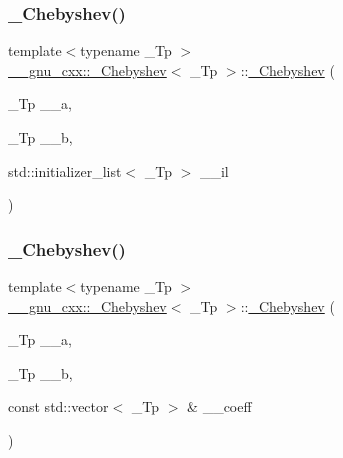 \mbox{\label{class____gnu__cxx_1_1__Chebyshev_a3bbf8155026331ee6a644253a4142d4e}} 
\subsubsection{\texorpdfstring{\+\_\+\+Chebyshev()}{\_Chebyshev()}\hspace{0.1cm}{\footnotesize\ttfamily [3/6]}}
{\footnotesize\ttfamily template$<$typename \+\_\+\+Tp $>$ \\
\hyperlink{class____gnu__cxx_1_1__Chebyshev}{\+\_\+\+\_\+gnu\+\_\+cxx\+::\+\_\+\+Chebyshev}$<$ \+\_\+\+Tp $>$\+::\hyperlink{class____gnu__cxx_1_1__Chebyshev}{\+\_\+\+Chebyshev} (\begin{DoxyParamCaption}\item[{\+\_\+\+Tp}]{\+\_\+\+\_\+a,  }\item[{\+\_\+\+Tp}]{\+\_\+\+\_\+b,  }\item[{std\+::initializer\+\_\+list$<$ \+\_\+\+Tp $>$}]{\+\_\+\+\_\+il }\end{DoxyParamCaption})\hspace{0.3cm}{\ttfamily [inline]}}

\mbox{\label{class____gnu__cxx_1_1__Chebyshev_a284eef7cb9971d933d19e10703d2029c}} 
\subsubsection{\texorpdfstring{\+\_\+\+Chebyshev()}{\_Chebyshev()}\hspace{0.1cm}{\footnotesize\ttfamily [4/6]}}
{\footnotesize\ttfamily template$<$typename \+\_\+\+Tp $>$ \\
\hyperlink{class____gnu__cxx_1_1__Chebyshev}{\+\_\+\+\_\+gnu\+\_\+cxx\+::\+\_\+\+Chebyshev}$<$ \+\_\+\+Tp $>$\+::\hyperlink{class____gnu__cxx_1_1__Chebyshev}{\+\_\+\+Chebyshev} (\begin{DoxyParamCaption}\item[{\+\_\+\+Tp}]{\+\_\+\+\_\+a,  }\item[{\+\_\+\+Tp}]{\+\_\+\+\_\+b,  }\item[{const std\+::vector$<$ \+\_\+\+Tp $>$ \&}]{\+\_\+\+\_\+coeff }\end{DoxyParamCaption})\hspace{0.3cm}{\ttfamily [inline]}}

